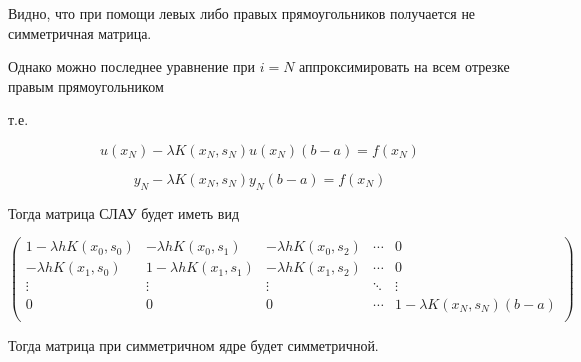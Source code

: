 \documentclass{article}
\begin{document}
\begin{enumerate}
	
	Видно, что при помощи левых либо правых прямоугольников получается не симметричная матрица.
	
	
	Однако можно последнее уравнение при $i = N$ аппроксимировать на всем отрезке правым прямоугольником
	
	т.е. 
	
	
	\[
	u(x_N) - \lambda K(x_N, s_N) u(x_N)(b-a) = f(x_N)
	\]
	
	\[
	y_N - \lambda K(x_N, s_N) y_N (b-a) = f(x_N)
	\]
	
	Тогда матрица СЛАУ будет иметь вид 
	
	\[
	\begin{pmatrix}
		1-\lambda hK(x_0, s_0) & -\lambda h K(x_0, s_1) & -\lambda h K(x_0, s_2) & \cdots & 0 \\
		-\lambda h K(x_1, s_0) & 1-\lambda h K(x_1, s_1) & -\lambda h K(x_1, s_2) & \cdots & 0 \\
		\vdots & \vdots & \vdots & \ddots & \vdots \\
		0 & 0 & 0 & \cdots & 1 -\lambda K(x_N, s_N) (b-a)\\
	\end{pmatrix}
	\]
	
	
	Тогда матрица при симметричном ядре будет симметричной. 
	\end{enumerate}
\end{document}
